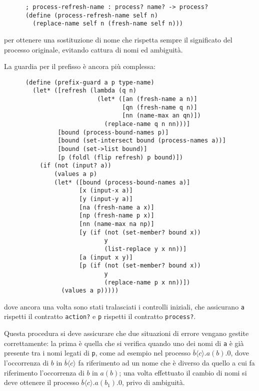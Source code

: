 \begin{lstlisting}
      ; process-refresh-name : process? name? -> process?
      (define (process-refresh-name self n)
        (replace-name self n (fresh-name self n)))
\end{lstlisting}

per ottenere una sostituzione di nome che rispetta sempre il significato
del processo originale, evitando cattura di nomi ed ambiguit\`a.

La guardia per il prefisso \`e ancora pi\`u complessa:

\begin{lstlisting}
      (define (prefix-guard a p type-name)
        (let* ([refresh (lambda (q n)
                          (let* ([an (fresh-name a n)]
                                 [qn (fresh-name q n)]
                                 [nn (name-max an qn)])
                            (replace-name q n nn)))]
               [bound (process-bound-names p)]
               [bound (set-intersect bound (process-names a))]
               [bound (set->list bound)]
               [p (foldl (flip refresh) p bound)])
          (if (not (input? a))
              (values a p)
              (let* ([bound (process-bound-names a)]
                     [x (input-x a)]
                     [y (input-y a)]
                     [na (fresh-name a x)]
                     [np (fresh-name p x)]
                     [nn (name-max na np)]
                     [y (if (not (set-member? bound x))
                            y
                            (list-replace y x nn))]
                     [a (input x y)]
                     [p (if (not (set-member? bound x))
                            y
                            (replace-name p x nn))])
                (values a p)))))
\end{lstlisting}

dove ancora una volta sono stati tralasciati i controlli iniziali, che
assicurano \lstinline{a} rispetti il contratto \lstinline{action?} e
\lstinline{p} rispetti il contratto \lstinline{process?}.

Questa procedura si deve assicurare che due situazioni di errore vengano
gestite correttamente: la prima \`e quella che si verifica quando uno dei
nomi di \lstinline{a} \`e gi\`a presente tra i nomi legati di
\lstinline{p}, come ad esempio nel processo
$\overline{b}\langle c\rangle.a(b).0$, dove l'occorrenza di $b$
in $\overline{b}\langle c\rangle$ fa riferimento ad un nome che \`e diverso
da quello a cui fa riferimento l'occorrenza di $b$ in $a(b)$; una volta
effettuato il cambio di nomi si deve ottenere il processo
$\overline{b}\langle c\rangle.a(b_1).0$, privo di ambiguit\`a.

